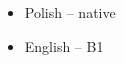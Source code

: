 \documentclass[9pt]{developercv}
\begin{document}
\vspace{0.5cm}

\begin{minipage}[t]{0.3\textwidth}
	\vspace{-\baselineskip}
	
	\begin{itemize}
		\item Polish – native
		\item English – B1
	\end{itemize}
\end{minipage}


\vfill
\end{document}
